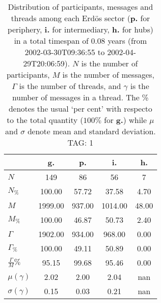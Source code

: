 \begin{table}[h!]
\begin{center}
\begin{tabular}{| l || c | c | c | c |}\hline
 & {\bf g.} & {\bf p.} & {\bf i.} & {\bf h.} \\\hline\hline
$N$ & 149  & 86  & 56  & 7 \\
$N_{\%}$ & 100.00  & 57.72  & 37.58  & 4.70 \\\hline
$M$ & 1999.00  & 937.00  & 1014.00  & 48.00 \\
$M_{\%}$ & 100.00  & 46.87  & 50.73  & 2.40 \\\hline
$\Gamma$ & 1902.00  & 934.00  & 968.00  & 0.00 \\
$\Gamma_{\%}$ & 100.00  & 49.11  & 50.89  & 0.00 \\\hline
$\frac{\Gamma}{M}\%$ & 95.15  & 99.68  & 95.46  & 0.00 \\
$\mu(\gamma)$ & 2.02  & 2.00  & 2.04  & nan \\
$\sigma(\gamma)$ & 0.15  & 0.03  & 0.21  & nan \\\hline
\end{tabular}
\caption{Distribution of participants, messages and threads among each Erd\"os sector ({\bf p.} for periphery, {\bf i.} for intermediary, 
    {\bf h.} for hubs) in a total timespan of 0.08 years (from 2002-03-30T09:36:55 to 2002-04-29T20:06:59). $N$ is the number of participants, $M$ is the number of messages, $\Gamma$ is the number of threads, and $\gamma$ is the number of messages in a thread.
    The \% denotes the usual `per cent' with respecto to the total quantity ($100\%$ for {\bf g.})
    while $\mu$ and $\sigma$ denote mean and standard deviation. TAG: 1}
\end{center}
\end{table}